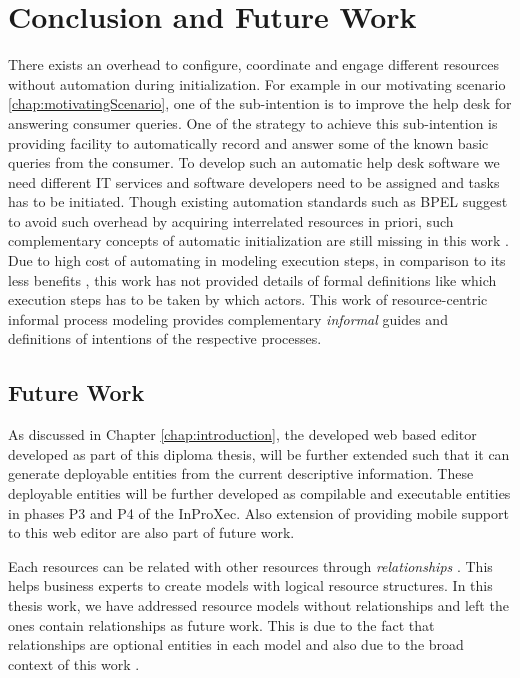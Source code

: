 \chapter{Conclusion and Future Work}
\label{chap:conclusion}

There exists an overhead to configure, coordinate and engage different resources without automation during initialization. For example in our motivating scenario \ref{chap:motivatingScenario}, one of the sub-intention is to improve the help desk for answering consumer queries. One of the strategy to achieve this sub-intention is providing facility to automatically record and answer some of the known basic queries from the consumer.  To develop such an automatic help desk software we need different IT services and software developers need to be assigned and tasks has to be initiated. Though existing automation standards such as BPEL suggest to avoid such overhead by acquiring interrelated resources in priori, such complementary concepts of automatic initialization are still missing in this work  \cite{Sungur2015}. Due to high cost of automating in modeling execution steps, in comparison to its less benefits \cite{Sungur2015}, this work has not provided details of  formal definitions like which execution steps has to be taken by which actors. This work of resource-centric informal process modeling provides complementary \textit{informal} guides and definitions of intentions of the respective processes. 

\section*{Future Work}
\label{sec:futurework}
As discussed in Chapter \ref{chap:introduction}, the developed web based editor developed as part of this diploma thesis, will be further extended such that it can generate deployable entities from the current descriptive information. These deployable entities will be further developed as compilable and executable entities in phases P3 and P4 of the InProXec. Also extension of providing mobile support to this web editor are also part of future work. 

Each resources can be related with other resources through \textit{relationships} . This helps business experts to create models with logical resource structures. In this thesis work, we have addressed resource models without relationships and left the ones contain relationships as future work. This is due to the fact that relationships are optional entities in each model and also due to the broad context of this work \cite{Sungur2014a}. 



